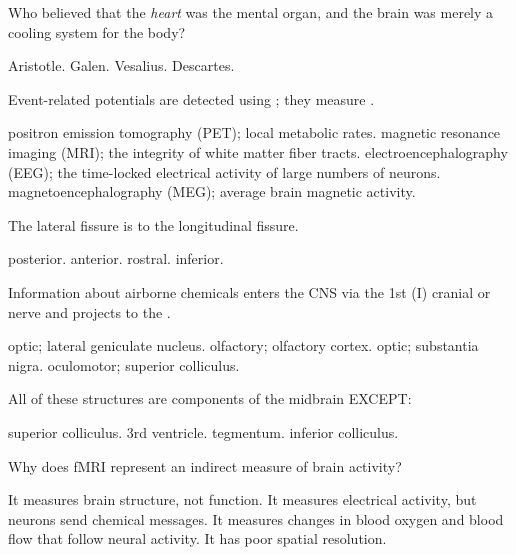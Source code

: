 \documentclass[answers]{exam}
\begin{document}
\begin{questions}
\question Who believed that the \emph{heart} was the mental organ, and the brain was merely a cooling system for the body?
\begin{choices}
\choice Aristotle.
\choice Galen.
\choice Vesalius.
\correctchoice Descartes.
\end{choices}

\newpage

\question Event-related potentials are detected using \fillin; they measure \fillin.
\begin{choices}
\choice positron emission tomography (PET); local metabolic rates.
\choice magnetic resonance imaging (MRI); the integrity of white matter fiber tracts.
\correctchoice electroencephalography (EEG); the time-locked electrical activity of large numbers of neurons.
\choice magnetoencephalography (MEG); average brain magnetic activity.
\end{choices}

\question The lateral fissure is \fillin to the longitudinal fissure.
\begin{choices}
\choice posterior.
\choice anterior.
\choice rostral.
\correctchoice inferior.
\end{choices}

\question Information about airborne chemicals enters the CNS via the 1st (I) cranial or \fillin nerve and projects to the \fillin.
\begin{choices}
\choice optic; lateral geniculate nucleus.
\correctchoice olfactory; olfactory cortex.
\choice optic; substantia nigra.
\choice oculomotor; superior colliculus.
\end{choices}


\question All of these structures are components of the midbrain EXCEPT:
\begin{choices}
\choice superior colliculus.
\correctchoice 3rd ventricle.
\choice tegmentum.
\choice inferior colliculus.
\end{choices}

\question Why does fMRI represent an indirect measure of brain activity?
\begin{choices}
\choice It measures brain structure, not function.
\choice It measures electrical activity, but neurons send chemical messages.
\correctchoice It measures changes in blood oxygen and blood flow that follow neural activity.
\choice It has poor spatial resolution.
\end{choices}


\end{questions}
\end{document}
